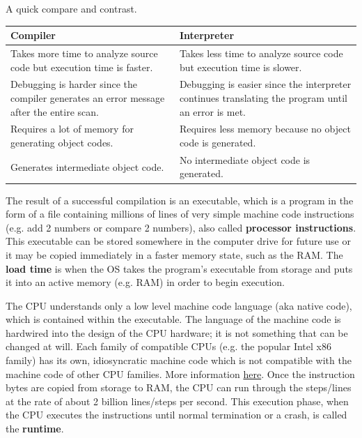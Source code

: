 \documentclass{article}
\begin{document}
      A quick compare and contrast.
      \begin{table}
      \centering
      \begin{tabular}{|p{7cm}|p{7cm}|}
      \hline
      \textbf{Compiler} & \textbf{Interpreter} \\
      \hline
      Takes more time to analyze source code but execution time is faster. & Takes less time to analyze source code but execution time is slower. \\
      \hline
      Debugging is harder since the compiler generates an error message after the entire scan. & Debugging is easier since the interpreter continues translating the program until an error is met. \\
      \hline
      Requires a lot of memory for generating object codes. & Requires less memory because no object code is generated. \\
      \hline
      Generates intermediate object code. & No intermediate object code is generated. \\
      \hline
      \end{tabular}
      \end{table}

      The result of a successful compilation is an executable, which is a program in the form of a file containing millions of lines of very simple machine code instructions (e.g. add 2 numbers or compare 2 numbers), also called \textbf{processor instructions}. This executable can be stored somewhere in the computer drive for future use or it may be copied immediately in a faster memory state, such as the RAM. The \textbf{load time} is when the OS takes the program's executable from storage and puts it into an active memory (e.g. RAM) in order to begin execution. 

      The CPU understands only a low level machine code language (aka native code), which is contained within the executable. The language of the machine code is hardwired into the design of the CPU hardware; it is not something that can be changed at will. Each family of compatible CPUs (e.g. the popular Intel x86 family) has its own, idiosyncratic machine code which is not compatible with the machine code of other CPU families. More information \href{https://web.stanford.edu/class/cs101/software-1.html}{here}. Once the instruction bytes are copied from storage to RAM, the CPU can run through the steps/lines at the rate of about 2 billion lines/steps per second. This execution phase, when the CPU executes the instructions until normal termination or a crash, is called the \textbf{runtime}.
\end{document}
